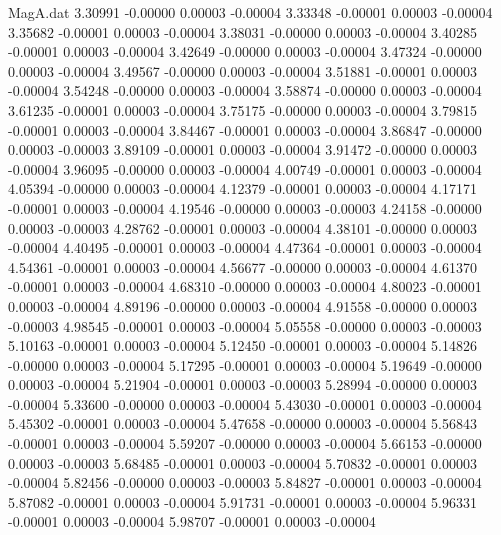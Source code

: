 \begin{filecontents}{MagA.dat}
   3.30991   -0.00000    0.00003   -0.00004
   3.33348   -0.00001    0.00003   -0.00004
   3.35682   -0.00001    0.00003   -0.00004
   3.38031   -0.00000    0.00003   -0.00004
   3.40285   -0.00001    0.00003   -0.00004
   3.42649   -0.00000    0.00003   -0.00004
   3.47324   -0.00000    0.00003   -0.00004
   3.49567   -0.00000    0.00003   -0.00004
   3.51881   -0.00001    0.00003   -0.00004
   3.54248   -0.00000    0.00003   -0.00004
   3.58874   -0.00000    0.00003   -0.00004
   3.61235   -0.00001    0.00003   -0.00004
   3.75175   -0.00000    0.00003   -0.00004
   3.79815   -0.00001    0.00003   -0.00004
   3.84467   -0.00001    0.00003   -0.00004
   3.86847   -0.00000    0.00003   -0.00003
   3.89109   -0.00001    0.00003   -0.00004
   3.91472   -0.00000    0.00003   -0.00004
   3.96095   -0.00000    0.00003   -0.00004
   4.00749   -0.00001    0.00003   -0.00004
   4.05394   -0.00000    0.00003   -0.00004
   4.12379   -0.00001    0.00003   -0.00004
   4.17171   -0.00001    0.00003   -0.00004
   4.19546   -0.00000    0.00003   -0.00003
   4.24158   -0.00000    0.00003   -0.00003
   4.28762   -0.00001    0.00003   -0.00004
   4.38101   -0.00000    0.00003   -0.00004
   4.40495   -0.00001    0.00003   -0.00004
   4.47364   -0.00001    0.00003   -0.00004
   4.54361   -0.00001    0.00003   -0.00004
   4.56677   -0.00000    0.00003   -0.00004
   4.61370   -0.00001    0.00003   -0.00004
   4.68310   -0.00000    0.00003   -0.00004
   4.80023   -0.00001    0.00003   -0.00004
   4.89196   -0.00000    0.00003   -0.00004
   4.91558   -0.00000    0.00003   -0.00003
   4.98545   -0.00001    0.00003   -0.00004
   5.05558   -0.00000    0.00003   -0.00003
   5.10163   -0.00001    0.00003   -0.00004
   5.12450   -0.00001    0.00003   -0.00004
   5.14826   -0.00000    0.00003   -0.00004
   5.17295   -0.00001    0.00003   -0.00004
   5.19649   -0.00000    0.00003   -0.00004
   5.21904   -0.00001    0.00003   -0.00003
   5.28994   -0.00000    0.00003   -0.00004
   5.33600   -0.00000    0.00003   -0.00004
   5.43030   -0.00001    0.00003   -0.00004
   5.45302   -0.00001    0.00003   -0.00004
   5.47658   -0.00000    0.00003   -0.00004
   5.56843   -0.00001    0.00003   -0.00004
   5.59207   -0.00000    0.00003   -0.00004
   5.66153   -0.00000    0.00003   -0.00003
   5.68485   -0.00001    0.00003   -0.00004
   5.70832   -0.00001    0.00003   -0.00004
   5.82456   -0.00000    0.00003   -0.00003
   5.84827   -0.00001    0.00003   -0.00004
   5.87082   -0.00001    0.00003   -0.00004
   5.91731   -0.00001    0.00003   -0.00004
   5.96331   -0.00001    0.00003   -0.00004
   5.98707   -0.00001    0.00003   -0.00004

\end{filecontents}
